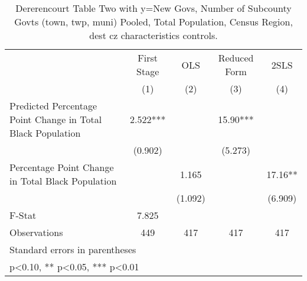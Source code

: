 \begin{table}[htbp]\centering
\def\sym#1{\ifmmode^{#1}\else\(^{#1}\)\fi}
\caption{Dererencourt Table Two with y=New Govs, Number of Subcounty Govts (town, twp, muni)  Pooled, Total Population, Census Region, dest cz characteristics controls.}
\begin{tabular}{l*{4}{c}}
\toprule
                    & First Stage   &         OLS   &Reduced Form   &        2SLS   \\
                    &\multicolumn{1}{c}{(1)}   &\multicolumn{1}{c}{(2)}   &\multicolumn{1}{c}{(3)}   &\multicolumn{1}{c}{(4)}   \\
\midrule
Predicted Percentage Point Change in Total Black Population&       2.522***&               &       15.90***&               \\
                    &     (0.902)   &               &     (5.273)   &               \\
\addlinespace
Percentage Point Change in Total Black Population&               &       1.165   &               &       17.16** \\
                    &               &     (1.092)   &               &     (6.909)   \\
\midrule
F-Stat              &       7.825   &               &               &               \\
Observations        &         449   &         417   &         417   &         417   \\
\bottomrule
\multicolumn{5}{l}{\footnotesize Standard errors in parentheses}\\
\multicolumn{5}{l}{\footnotesize * p<0.10, ** p<0.05, *** p<0.01}\\
\end{tabular}
\end{table}
